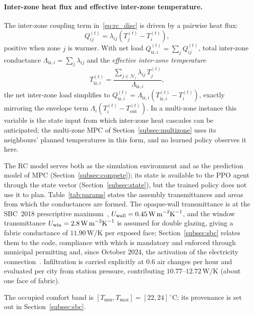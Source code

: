 \documentclass[3p,twocolumn,number]{elsarticle}
\newcommand{\Tmin}{T_{\min}}
\newcommand{\Tmax}{T_{\max}}
\newcommand{\Tout}{T_{\mathrm{out}}}
\newcommand{\lij}{\lambda_{ij}}
\newcommand{\Liz}[1]{\Lambda_{\mathrm{iz},#1}}
\newcommand{\Tiz}[1]{T_{\mathrm{iz},#1}}
\newcommand{\Qiz}[1]{Q_{\mathrm{iz},#1}}
\begin{document}
\paragraph{Inter-zone heat flux and effective inter-zone temperature.}
The inter-zone coupling term in~\eqref{eq:rc_disc} is driven by a pairwise heat flux:
\begin{equation}
  Q_{ij}^{(t)} = \lij\!\left(T_j^{(t)}-T_i^{(t)}\right),
  \label{eq:qij}
\end{equation}
positive when zone $j$ is warmer. With net load $\Qiz{i}^{(t)}=\sum_j Q_{ij}^{(t)}$, total inter-zone conductance $\Liz{i}=\sum_j\lij$ and the \emph{effective inter-zone temperature}
\begin{equation}
  \Tiz{i}^{(t)}
  =\frac{\displaystyle\sum_{j\in\mathcal{N}_i}\lij\,T_j^{(t)}}{\Liz{i}},
  \label{eq:tiz}
\end{equation}
the net inter-zone load simplifies to $\Qiz{i}^{(t)}=\Liz{i}\!\left(\Tiz{i}^{(t)}-T_i^{(t)}\right)$, exactly mirroring the envelope term $\Lambda_i(T_i^{(t)}-\Tout^{(t)})$. In a multi-zone instance this variable is the state input from which inter-zone heat cascades can be anticipated; the multi-zone MPC of Section~\ref{subsec:multizone} uses its neighbours' planned temperatures in this form, and no learned policy observes it here.
 
The RC model serves both as the simulation environment and as the prediction model of MPC (Section~\ref{subsec:compete}); its state is available to the PPO agent through the state vector (Section~\ref{subsec:state}), but the trained policy does not use it to plan. Table~\ref{tab:params} states the assembly transmittances and areas from which the conductances are formed. The opaque-wall transmittance is at the SBC~2018 prescriptive maximum~\cite{Alayed2021}, $U_{\mathrm{wall}}=0.45\,\text{W\,m}^{-2}\text{K}^{-1}$, and the window transmittance $U_{\mathrm{win}}=2.8\,\text{W\,m}^{-2}\text{K}^{-1}$ is assumed for double glazing, giving a fabric conductance of $11.90\,\text{W/K}$ per exposed face; Section~\ref{subsec:sbc} relates them to the code, compliance with which is mandatory and enforced through municipal permitting and, since October 2024, the activation of the electricity connection~\cite{SBCgov2024}. Infiltration is carried explicitly at $0.6$ air changes per hour and evaluated per city from station pressure, contributing $10.77$--$12.72\,\mathrm{W/K}$ (about one face of fabric).

The occupied comfort band is $[\Tmin,\Tmax]{=}[22,24]\,^\circ$C; its provenance is set out in Section~\ref{subsec:sbc}.
 
\end{document}
